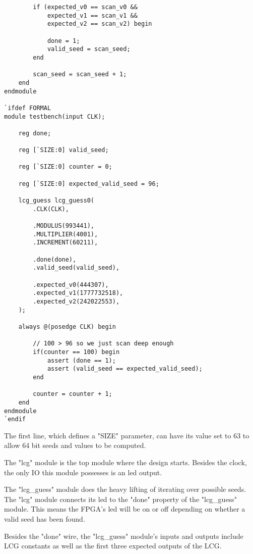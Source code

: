 \documentclass{article}
\begin{document}
\begin{lstlisting}
        if (expected_v0 == scan_v0 &&
            expected_v1 == scan_v1 &&
            expected_v2 == scan_v2) begin
            
            done = 1;
            valid_seed = scan_seed;
        end
        
        scan_seed = scan_seed + 1;
    end
endmodule

`ifdef FORMAL
module testbench(input CLK);
    
    reg done;
    
    reg [`SIZE:0] valid_seed;
    
    reg [`SIZE:0] counter = 0;
    
    reg [`SIZE:0] expected_valid_seed = 96;
    
    lcg_guess lcg_guess0(
        .CLK(CLK),
        
        .MODULUS(993441),
        .MULTIPLIER(4001),
        .INCREMENT(60211),
        
        .done(done),
        .valid_seed(valid_seed),
        
        .expected_v0(444307),
        .expected_v1(1777732518),
        .expected_v2(242022553),
    );
    
    always @(posedge CLK) begin
        
        // 100 > 96 so we just scan deep enough
        if(counter == 100) begin
            assert (done == 1); 
            assert (valid_seed == expected_valid_seed); 
        end
        
        counter = counter + 1;
    end
endmodule
`endif

    \end{lstlisting}

    The first line, which defines a "SIZE" parameter, can
    have its value set to 63 to allow 64 bit seeds and values
    to be computed.

    The "lcg" module is the top module where the design starts.
    Besides the clock, the only IO this module possesses is an led output.

    The "lcg\_guess" module does the heavy lifting of iterating over possible
    seeds. The "lcg" module connects its led to the "done" property of
    the "lcg\_guess" module. This means the FPGA's led will be on or off
    depending on whether a valid seed has been found.

    Besides the "done" wire, the "lcg\_guess" module's inputs and outputs include
    LCG constants as well as the first three expected outputs of the LCG.
\end{document}
